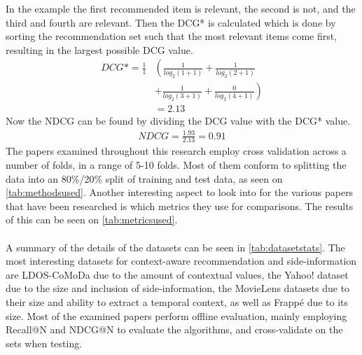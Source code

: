 In the example the first recommended item is relevant, the second is not, and the third and fourth are relevant.
Then the DCG* is calculated which is done by sorting the recommendation set such that the most relevant items come first, resulting in the largest possible DCG value.
\begin{align*}
    DCG* = \frac{1}{1} &\left (\frac{1}{log_2 (1+1)} + \frac{1}{log_2 (2+1)} \right.\\
    & \left.+ \frac{1}{log_2 (3+1)} + \frac{0}{log_2 (4+1)}\right) \\
    & = 2.13
\end{align*}
Now the NDCG can be found by dividing the DCG value with the DCG* value.
\begin{align*}
    NDCG = \frac{1.93}{2.13} = 0.91
\end{align*}
The papers examined throughout this research employ cross validation across a number of folds, in a range of 5-10 folds.
Most of them conform to splitting the data into an 80\%/20\% split of training and test data, as seen on \autoref{tab:methodsused}.
Another interesting aspect to look into for the various papers that have been researched is which metrics they use for comparisons.
The results of this can be seen on \autoref{tab:metricsused}.
\\\\
A summary of the details of the datasets can be seen in \autoref{tab:datasetstats}.
The most interesting datasets for context-aware recommendation and side-information are LDOS-CoMoDa due to the amount of contextual values, the Yahoo! dataset due to the size and inclusion of side-information, the MovieLens datasets due to their size and ability to extract a temporal context, as well as Frappé due to its size.
Most of the examined papers perform offline evaluation, mainly employing Recall@N and NDCG@N to evaluate the algorithms, and cross-validate on the sets when testing.


